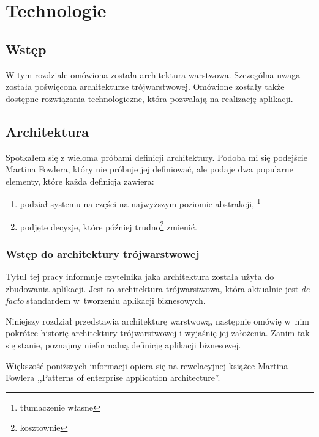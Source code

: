 \documentclass[a4paper,onecolumn,oneside,11pt,wide,floatssmall]{mwrep}
\theoremstyle{definition}
\theoremstyle{plain}%
\theoremstyle{remark}
\begin{document}
\chapter{Technologie}
\section{Wstęp}
W tym rozdziale omówiona została architektura warstwowa. Szczególna uwaga została poświęcona architekturze trójwarstwowej. Omówione zostały także dostępne rozwiązania technologiczne, która pozwalają na realizację aplikacji.

\section{Architektura}
Spotkałem się z wieloma próbami definicji architektury. Podoba mi się podejście Martina Fowlera, który nie próbuje jej 
definiować, ale podaje dwa popularne elementy, które każda definicja zawiera: \cite{fowler2003patterns}

\begin{enumerate}
  \item podział systemu na części na najwyższym poziomie abstrakcji, \footnote{tłumaczenie własne}
  \item podjęte decyzje, które później trudno\footnote{kosztownie} zmienić.
\end{enumerate}
\subsection{Wstęp do architektury trójwarstwowej}
Tytuł tej pracy informuje czytelnika jaka architektura została użyta do zbudowania aplikacji. Jest to 
architektura trójwarstwowa, która aktualnie jest \emph{de facto} standardem \mbox{w tworzeniu} aplikacji biznesowych. 

Niniejszy rozdział przedstawia architekturę warstwową, następnie omówię \mbox{w nim} pokrótce historię architektury trójwarstwowej i 
wyjaśnię jej założenia. Zanim tak się stanie, poznajmy nieformalną definicję aplikacji biznesowej. 

Większość poniższych informacji opiera się na rewelacyjnej książce Martina Fowlera 
,,Patterns of enterprise application architecture''. \cite{fowler2003patterns}
\end{document}

